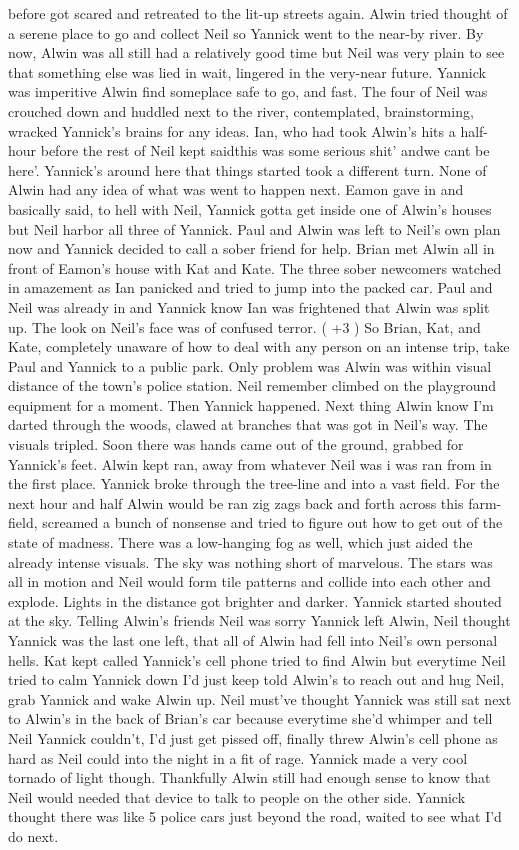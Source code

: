 \documentclass[12pt]{book}
\begin{document}
before got scared and retreated to the lit-up streets again. Alwin tried thought of a serene place to go and collect Neil so Yannick went to the near-by river. By now, Alwin was all still had a relatively good time but Neil was very plain to see that something else was lied in wait, lingered in the very-near future. Yannick was imperitive Alwin find someplace safe to go, and fast. The four of Neil was crouched down and huddled next to the river, contemplated, brainstorming, wracked Yannick's brains for any ideas. Ian, who had took Alwin's hits a half-hour before the rest of Neil kept saidthis was some serious shit' andwe cant be here'. Yannick's around here that things started took a different turn. None of Alwin had any idea of what was went to happen next. Eamon gave in and basically said, to hell with Neil, Yannick gotta get inside one of Alwin's houses but Neil harbor all three of Yannick. Paul and Alwin was left to Neil's own plan now and Yannick decided to call a sober friend for help. Brian met Alwin all in front of Eamon's house with Kat and Kate. The three sober newcomers watched in amazement as Ian panicked and tried to jump into the packed car. Paul and Neil was already in and Yannick know Ian was frightened that Alwin was split up. The look on Neil's face was of confused terror. ( +3 ) So Brian, Kat, and Kate, completely unaware of how to deal with any person on an intense trip, take Paul and Yannick to a public park. Only problem was Alwin was within visual distance of the town's police station. Neil remember climbed on the playground equipment for a moment. Then Yannick happened. Next thing Alwin know I'm darted through the woods, clawed at branches that was got in Neil's way. The visuals tripled. Soon there was hands came out of the ground, grabbed for Yannick's feet. Alwin kept ran, away from whatever Neil was i was ran from in the first place. Yannick broke through the tree-line and into a vast field. For the next hour and half Alwin would be ran zig zags back and forth across this farm-field, screamed a bunch of nonsense and tried to figure out how to get out of the state of madness. There was a low-hanging fog as well, which just aided the already intense visuals. The sky was nothing short of marvelous. The stars was all in motion and Neil would form tile patterns and collide into each other and explode. Lights in the distance got brighter and darker. Yannick started shouted at the sky. Telling Alwin's friends Neil was sorry Yannick left Alwin, Neil thought Yannick was the last one left, that all of Alwin had fell into Neil's own personal hells. Kat kept called Yannick's cell phone tried to find Alwin but everytime Neil tried to calm Yannick down I'd just keep told Alwin's to reach out and hug Neil, grab Yannick and wake Alwin up. Neil must've thought Yannick was still sat next to Alwin's in the back of Brian's car because everytime she'd whimper and tell Neil Yannick couldn't, I'd just get pissed off, finally threw Alwin's cell phone as hard as Neil could into the night in a fit of rage. Yannick made a very cool tornado of light though. Thankfully Alwin still had enough sense to know that Neil would needed that device to talk to people on the other side. Yannick thought there was like 5 police cars just beyond the road, waited to see what I'd do next. 
\end{document}

